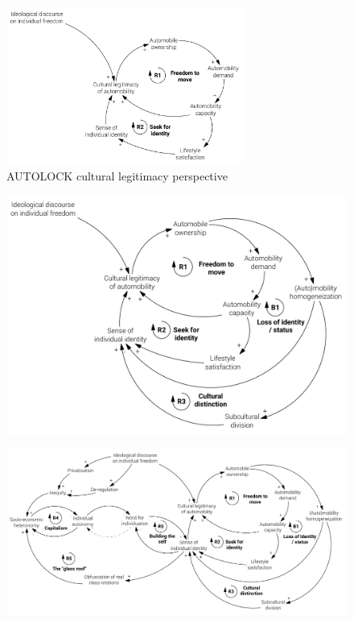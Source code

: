 \begin{figure}[h]
\centering
\includegraphics[width=0.7\textwidth]{figures/model/cropped/cultural_1_core.pdf}
\caption{AUTOLOCK cultural legitimacy perspective}
\label{f:results:cld_culture_1}
\end{figure}



\begin{figure}[h]
\centering
\includegraphics[width=\textwidth]{figures/model/cropped/cultural_2_subcultures.pdf}
\caption[]{}
\label{f:results:cld_culture_2}
\end{figure}

\begin{figure}
\includegraphics[width=1.2\textwidth,center]{figures/model/cropped/cultural_3_final.pdf}
\caption[]{}
\label{f:results:cld_culture_3}
\end{figure}

